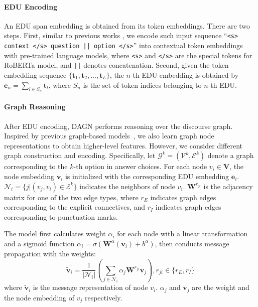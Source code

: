 \documentclass[11pt]{article}
\newcommand{\moe}[1]{{\color{black} #1}}
\begin{document}
\paragraph{EDU Encoding}
An EDU span embedding is obtained from its token embeddings.
\moe{
There are two steps. 
First, similar to previous works \cite{yu2020reclor,liu2020logiqa},} 
we encode such input sequence ``\texttt{<s> context </s> question || option </s>}'' into contextual token embeddings with pre-trained language models,
where \texttt{<s>} and \texttt{</s>} are the special tokens for RoBERTa \cite{liu2019roberta} model, and \texttt{||} denotes concatenation. \moe{Second,} given the token embedding sequence $\{\mathbf{t}_1, \mathbf{t}_2,...,\mathbf{t}_L\}$, the $n$-th EDU embedding is obtained by $\mathbf{e}_n=\sum\limits_{l \in {S_n}} {\mathbf{t}_l}$, where $S_n$ is the set of token indices belonging to $n$-th EDU.




\paragraph{\moe{Graph Reasoning}} \moe{After EDU encoding, DAGN performs reasoning over the discourse graph. 
Inspired by previous graph-based models~\cite{ran2019numnet,chen2020question},
we also learn graph node representations to obtain higher-level features. However, we consider different graph construction and encoding.
Specifically, let $\mathcal{G}^k = (\mathcal{V}^k, \mathcal{E}^k)$ denote a graph corresponding to the $k$-th option in answer choices.
For each node $v_i \in \mathbf{V}$, the node embedding $\mathbf{v}_i$ is initialized with the corresponding EDU embedding $\textbf{e}_i$. 
$\mathcal{N}_i = \{j|(v_j, v_i)\in\mathcal{E}^k \}$ indicates the neighbors of node $v_i$.
$\mathbf{W}^{r_{ji}}$ is the adjacency matrix for one of the two edge types, 
where $r_E$ indicates graph edges corresponding to the explicit connectives, 
and $r_I$ indicates graph edges corresponding to punctuation marks.}

The model first calculates weight $\alpha_i$ for each node with a linear transformation and a sigmoid function $\alpha_i=\sigma(\mathbf{W}^{\alpha}(\mathbf{v}_i)+b^{\alpha})$, then conducts message propagation with the weights:
\begin{equation}
    \tilde{\mathbf{v}}_i = \frac{1}{|\mathcal{N}_i|}(\sum_{j\in\mathcal{N}_i}\alpha_j\mathbf{W}^{r_{ji}}\mathbf{v}_j),  r_{ji} \in \{r_E, r_I\}
\end{equation}
\noindent where $\tilde{\mathbf{v}}_i$ is the message representation of node $v_i$. 
$\alpha_j$ and $\mathbf{v}_j$ are the weight and the node embedding of $v_j$ respectively.
\end{document}
